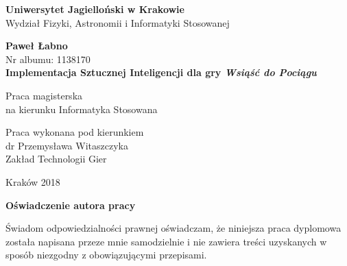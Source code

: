 \documentclass[12pt, oneside]{report}
\begin{document}
  
	\setcounter{tocdepth}{1} %
	\thispagestyle{empty}
	\begin{titlepage}
		\begin{center}
			
			\Large
			\textbf{Uniwersytet Jagielloński w Krakowie}\vspace{0.2cm}\\ Wydział Fizyki, Astronomii i Informatyki Stosowanej
			\vspace*{1cm}
			
			\vspace{3cm}
			\Large
			\textbf{Paweł Łabno}\\\vspace{0.5cm}
			\normalsize Nr albumu: 1138170\\
			\vspace{2cm}
			\Huge
			\textbf{Implementacja Sztucznej Inteligencji dla gry \textit{Wsiąść do Pociągu}}
			
			\vspace{1.5cm}
			\normalsize
			Praca magisterska\\
			na kierunku Informatyka Stosowana\\ \vspace{0.15cm}
			
			\vfill
			\vspace{2cm}
			\begin{minipage}{1\textwidth}
				\begin{flushright}
					Praca wykonana pod kierunkiem\\
					dr Przemysława Witaszczyka\\
					Zakład Technologii Gier
				\end{flushright}
			\end{minipage}
			
			\vspace{2cm}
			\begin{center}
				Kraków 2018
			\end{center}
		\end{center}
	\end{titlepage}
	
	\newpage 
	\thispagestyle{empty}
	\vspace{2.5cm}
	\begin{flushleft}
		\large \textbf{Oświadczenie autora pracy}\vspace{0.6cm}\\
	\end{flushleft}
	
	\noindent Świadom odpowiedzialności prawnej oświadczam, że niniejsza praca dyplomowa została napisana przeze mnie samodzielnie i nie zawiera treści uzyskanych w sposób niezgodny z obowiązującymi przepisami.\\
	
\end{document}
